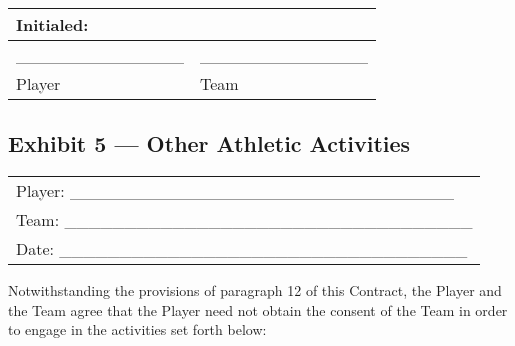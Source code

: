 \documentclass[
]{book}
\begin{document}
\begin{longtable}[]{@{}ll@{}}
\toprule()
Initialed: & \\
\midrule()
\endhead
\_\_\_\_\_\_\_\_\_\_\_\_\_\_ & \_\_\_\_\_\_\_\_\_\_\_\_\_\_ \\
Player & Team \\
\bottomrule()
\end{longtable}

\newpage

\hypertarget{exhibit-5-other-athletic-activities}{%
\subsection{Exhibit 5 --- Other Athletic Activities}\label{exhibit-5-other-athletic-activities}}

\begin{longtable}[]{@{}l@{}}
\toprule()
\endhead
Player: \_\_\_\_\_\_\_\_\_\_\_\_\_\_\_\_\_\_\_\_\_\_\_\_\_\_\_\_\_\_\_\_ \\
Team: \_\_\_\_\_\_\_\_\_\_\_\_\_\_\_\_\_\_\_\_\_\_\_\_\_\_\_\_\_\_\_\_\_\_ \\
Date: \_\_\_\_\_\_\_\_\_\_\_\_\_\_\_\_\_\_\_\_\_\_\_\_\_\_\_\_\_\_\_\_\_\_ \\
\bottomrule()
\end{longtable}

Notwithstanding the provisions of paragraph 12 of this Contract, the Player and the Team agree that the Player need not obtain the consent of the Team in order to engage in the activities set forth below:
\end{document}
